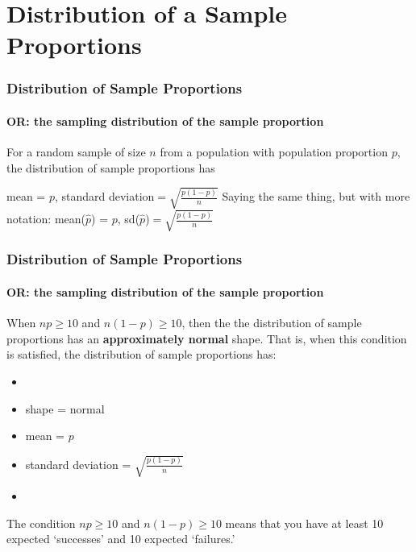 \section[Distribution of $\hat{p}$]{Distribution of a Sample Proportions}
\begin{frame}
\end{frame}


\begin{frame}
\frametitle{Distribution of Sample Proportions}
\framesubtitle{OR: the sampling distribution of the sample proportion}
For a random sample of size $n$ from a population with population proportion $p$, the distribution of sample proportions has
\begin{center}
mean = $p$, standard deviation$=\displaystyle\sqrt{\frac{p(1-p)}{n}}$
\vskip50pt
Saying the same thing, but with more notation:
\vskip10pt
mean($\hat{p}$) = $p$, sd($\hat{p}$)$=\displaystyle\sqrt{\frac{p(1-p)}{n}}$
\end{center}
\end{frame}


\begin{frame}
\frametitle{Distribution of Sample Proportions}
\framesubtitle{OR: the sampling distribution of the sample proportion}
When $np\ge10$ and $n(1-p)\ge10$, then the the distribution of sample proportions has an \textbf{approximately normal} shape.  That is, when this condition is satisfied, the distribution of sample proportions has:
\begin{itemize}
\item[]
\item shape = normal
\item mean = $p$
\item standard deviation = $\displaystyle\sqrt{\frac{p(1-p)}{n}}$
\item[]
\end{itemize}
The condition $np\ge10$ and $n(1-p)\ge 10$ means that you have at least 10 expected `successes' and 10 expected `failures.'
\end{frame}

